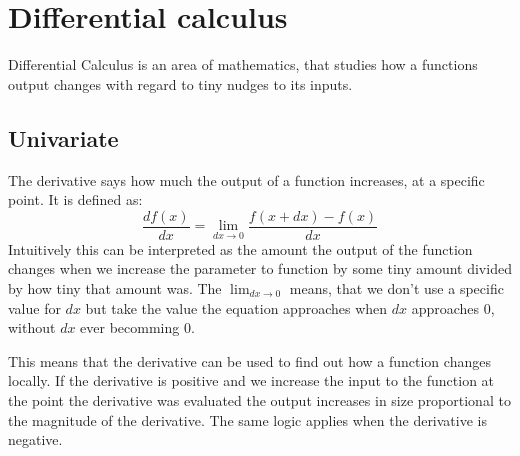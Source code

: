\documentclass[a4paper, twoside, 10pt]{report}
\begin{document}
\section{Differential calculus}
Differential Calculus is an area of mathematics, that studies how a functions output changes with regard to tiny nudges to its inputs. 

\subsection{Univariate}
The derivative says how much the output of a function increases, at a specific point. It is defined as: 
\begin{equation}
\frac{df(x)}{dx} = \lim_{dx \to 0}\frac{f(x + dx) - f(x)}{dx}
\end{equation}
Intuitively this can be interpreted as the amount the output of the function changes when we increase the parameter to function by some tiny amount divided by how tiny that amount was. The $\lim_{dx \to 0}$ means, that we don't use a specific value for $dx$ but take the value the equation approaches when $dx$ approaches $0$, without $dx$ ever becomming $0$.

This means that the derivative can be used to find out how a function changes locally. If the derivative is positive and we increase the input to the function at the point the derivative was evaluated the output increases in size proportional to the magnitude of the derivative. The same logic applies when the derivative is negative.

\end{document}
